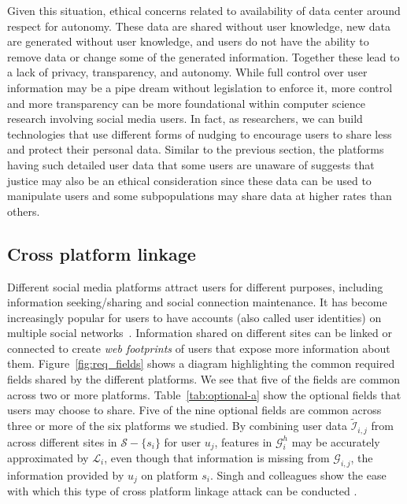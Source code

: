 \documentclass[11pt]{article} %
\begin{document}
Given this situation, ethical concerns related to availability of data center around respect for autonomy. These data are shared without user knowledge, new data are generated without user knowledge, and users do not have the ability to remove data or change some of the generated information. Together these lead to a lack of privacy, transparency, and autonomy. While full control over user information may be a pipe dream without legislation to enforce it, more control and more transparency can be more foundational within computer science research involving social media users. In fact, as researchers, we can build technologies that use different forms of nudging \cite{thaler2009} to encourage users to share less and protect their personal data.
Similar to the previous section, the platforms having such detailed user data that some users are unaware of suggests that justice may also be an ethical consideration since these data can be used to manipulate users and some subpopulations may share data at higher rates than others. 


\subsection{Cross platform linkage}
Different social media platforms attract users for different purposes, including information seeking/sharing and social connection maintenance. It has become increasingly popular for users to have accounts (also called user identities) on multiple social networks~\cite{10.1145/3068777.3068781}. Information shared on different sites can be linked or connected to create \textit{web footprints} of users that expose more information about them. 
Figure~\ref{fig:req_fields} shows a diagram highlighting the common required fields shared by the different platforms. We see that five of the fields are common across two or more platforms. Table~\ref{tab:optional-a} show the optional fields that users may choose to share. 
Five of the nine optional fields are common across three or more of the six platforms we studied. 
By combining user data $\widetilde{\mathcal{I}}_{i,j}$ from across different sites in $\mathcal{S} - \{s_i\}$ for user $u_j$, features in $\mathcal{G}^h_i$ may be accurately approximated by $\mathcal{L}_i$, even though that information is missing from $\mathcal{G}_{i,j}$, the information provided by $u_j$ on platform $s_i$. Singh and colleagues show the ease with which this type of cross platform linkage attack can be conducted \cite{singh2015}. 
\end{document}
